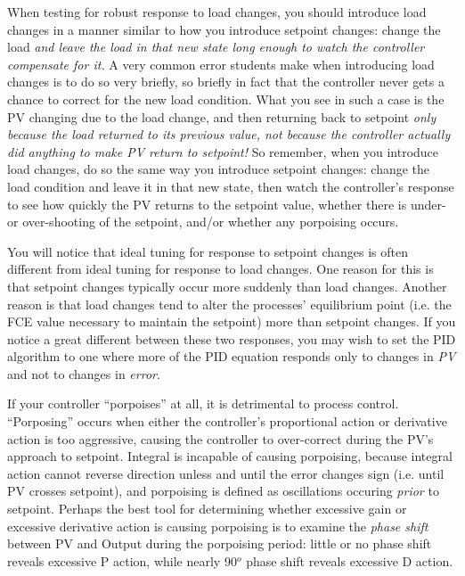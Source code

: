 \documentclass[12pt,a4paper]{article}
\begin{document}
\vskip 10pt

When testing for robust response to load changes, you should introduce load changes in a manner similar to how you introduce setpoint changes: change the load {\it and leave the load in that new state long enough to watch the controller compensate for it.}  A very common error students make when introducing load changes is to do so very briefly, so briefly in fact that the controller never gets a chance to correct for the new load condition.  What you see in such a case is the PV changing due to the load change, and then returning back to setpoint {\it only because the load returned to its previous value, not because the controller actually did anything to make PV return to setpoint!}  So remember, when you introduce load changes, do so the same way you introduce setpoint changes: change the load condition and leave it in that new state, then watch the controller's response to see how quickly the PV returns to the setpoint value, whether there is under- or over-shooting of the setpoint, and/or whether any porpoising occurs.

\vskip 10pt

You will notice that ideal tuning for response to setpoint changes is often different from ideal tuning for response to load changes.  One reason for this is that setpoint changes typically occur more suddenly than load changes.  Another reason is that load changes tend to alter the processes' equilibrium point (i.e. the FCE value necessary to maintain the setpoint) more than setpoint changes.  If you notice a great different between these two responses, you may wish to set the PID algorithm to one where more of the PID equation responds only to changes in {\it PV} and not to changes in {\it error}.

\vskip 10pt

If your controller ``porpoises'' at all, it is detrimental to process control.  ``Porposing'' occurs when either the controller's proportional action or derivative action is too aggressive, causing the controller to over-correct during the PV's approach to setpoint.  Integral is incapable of causing porpoising, because integral action cannot reverse direction unless and until the error changes sign (i.e. until PV crosses setpoint), and porpoising is defined as oscillations occuring {\it prior} to setpoint.  Perhaps the best tool for determining whether excessive gain or excessive derivative action is causing porpoising is to examine the {\it phase shift} between PV and Output during the porpoising period: little or no phase shift reveals excessive P action, while nearly 90$^{o}$ phase shift reveals excessive D action.
\end{document}

